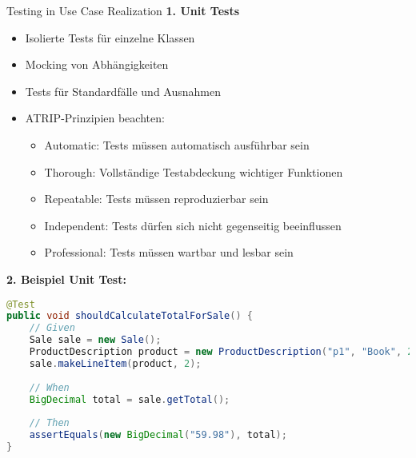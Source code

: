 \begin{KR}{Testing in Use Case Realization}
\textbf{1. Unit Tests}
\begin{itemize}
    \item Isolierte Tests für einzelne Klassen
    \item Mocking von Abhängigkeiten
    \item Tests für Standardfälle und Ausnahmen
    \item ATRIP-Prinzipien beachten:
    \begin{itemize}
        \item Automatic: Tests müssen automatisch ausführbar sein
        \item Thorough: Vollständige Testabdeckung wichtiger Funktionen
        \item Repeatable: Tests müssen reproduzierbar sein
        \item Independent: Tests dürfen sich nicht gegenseitig beeinflussen
        \item Professional: Tests müssen wartbar und lesbar sein
    \end{itemize}
\end{itemize}

\textbf{2. Beispiel Unit Test:}
\begin{lstlisting}[language=Java, style=basesmol]
@Test
public void shouldCalculateTotalForSale() {
    // Given
    Sale sale = new Sale();
    ProductDescription product = new ProductDescription("p1", "Book", 29.99);
    sale.makeLineItem(product, 2);
    
    // When
    BigDecimal total = sale.getTotal();
    
    // Then
    assertEquals(new BigDecimal("59.98"), total);
}
\end{lstlisting}
\end{KR}

